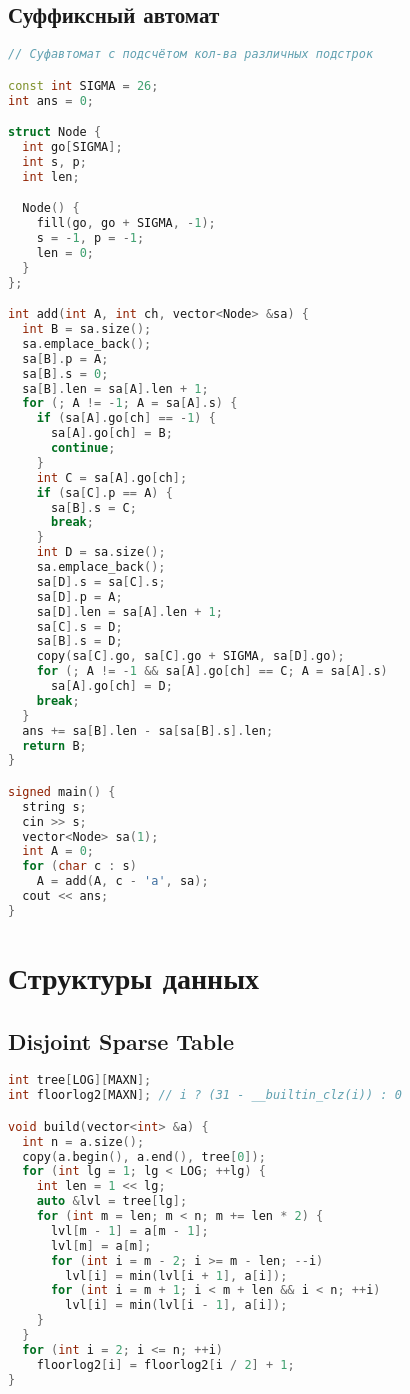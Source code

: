 \documentclass[10pt,a4paper,landscape,twosided]{extarticle}
\begin{document}
\begin{multicols*}{3}
\subsection{Суффиксный автомат}
\begin{lstlisting}[language=C++]
// Суфавтомат с подсчётом кол-ва различных подстрок

const int SIGMA = 26;
int ans = 0;

struct Node {
  int go[SIGMA];
  int s, p;
  int len;

  Node() {
    fill(go, go + SIGMA, -1);
    s = -1, p = -1;
    len = 0;
  }
};

int add(int A, int ch, vector<Node> &sa) {
  int B = sa.size();
  sa.emplace_back();
  sa[B].p = A;
  sa[B].s = 0;
  sa[B].len = sa[A].len + 1;
  for (; A != -1; A = sa[A].s) {
    if (sa[A].go[ch] == -1) {
      sa[A].go[ch] = B;
      continue;
    }
    int C = sa[A].go[ch];
    if (sa[C].p == A) {
      sa[B].s = C;
      break;
    }
    int D = sa.size();
    sa.emplace_back();
    sa[D].s = sa[C].s;
    sa[D].p = A;
    sa[D].len = sa[A].len + 1;
    sa[C].s = D;
    sa[B].s = D;
    copy(sa[C].go, sa[C].go + SIGMA, sa[D].go);
    for (; A != -1 && sa[A].go[ch] == C; A = sa[A].s)
      sa[A].go[ch] = D;
    break;
  }
  ans += sa[B].len - sa[sa[B].s].len;
  return B;
}

signed main() {
  string s;
  cin >> s;
  vector<Node> sa(1);
  int A = 0;
  for (char c : s)
    A = add(A, c - 'a', sa);
  cout << ans;
}
\end{lstlisting}

\section{Структуры данных}

\subsection{Disjoint Sparse Table}
\begin{lstlisting}[language=C++]
int tree[LOG][MAXN];
int floorlog2[MAXN]; // i ? (31 - __builtin_clz(i)) : 0

void build(vector<int> &a) {
  int n = a.size();
  copy(a.begin(), a.end(), tree[0]);
  for (int lg = 1; lg < LOG; ++lg) {
    int len = 1 << lg;
    auto &lvl = tree[lg];
    for (int m = len; m < n; m += len * 2) {
      lvl[m - 1] = a[m - 1];
      lvl[m] = a[m];
      for (int i = m - 2; i >= m - len; --i)
        lvl[i] = min(lvl[i + 1], a[i]);
      for (int i = m + 1; i < m + len && i < n; ++i)
        lvl[i] = min(lvl[i - 1], a[i]);
    }
  }
  for (int i = 2; i <= n; ++i)
    floorlog2[i] = floorlog2[i / 2] + 1;
}


\end{lstlisting}
\end{multicols*}
\end{document}
